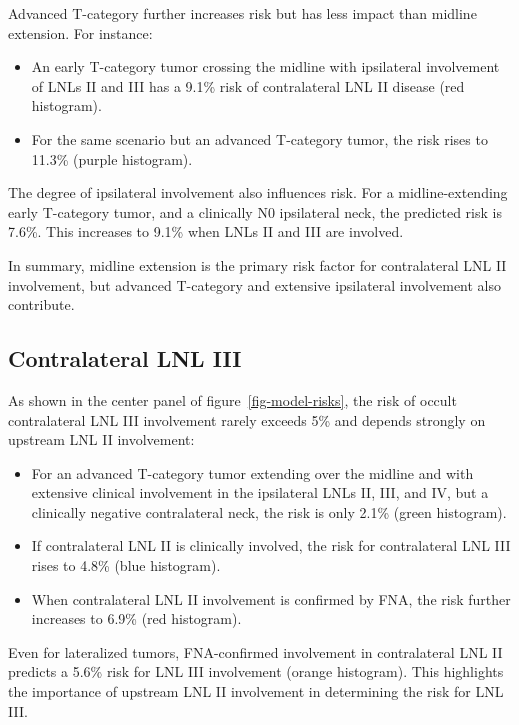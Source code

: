 \documentclass[
  sn-mathphys-num,
]{sn-jnl}
\providecommand{\tightlist}{%
  \setlength{\itemsep}{0pt}\setlength{\parskip}{0pt}}\usepackage{longtable,booktabs,array}
\begin{document}
Advanced T-category further increases risk but has less impact than
midline extension. For instance:

\begin{itemize}
\tightlist
\item
  An early T-category tumor crossing the midline with ipsilateral
  involvement of LNLs II and III has a 9.1\% risk of contralateral LNL
  II disease (red histogram).\\
\item
  For the same scenario but an advanced T-category tumor, the risk rises
  to 11.3\% (purple histogram).
\end{itemize}

The degree of ipsilateral involvement also influences risk. For a
midline-extending early T-category tumor, and a clinically N0
ipsilateral neck, the predicted risk is 7.6\%. This increases to 9.1\%
when LNLs II and III are involved.

In summary, midline extension is the primary risk factor for
contralateral LNL II involvement, but advanced T-category and extensive
ipsilateral involvement also contribute.

\subsection{Contralateral LNL III}\label{contralateral-lnl-iii}

As shown in the center panel of figure~\ref{fig-model-risks}, the risk
of occult contralateral LNL III involvement rarely exceeds 5\% and
depends strongly on upstream LNL II involvement:

\begin{itemize}
\tightlist
\item
  For an advanced T-category tumor extending over the midline and with
  extensive clinical involvement in the ipsilateral LNLs II, III, and
  IV, but a clinically negative contralateral neck, the risk is only
  2.1\% (green histogram).\\
\item
  If contralateral LNL II is clinically involved, the risk for
  contralateral LNL III rises to 4.8\% (blue histogram).\\
\item
  When contralateral LNL II involvement is confirmed by FNA, the risk
  further increases to 6.9\% (red histogram).
\end{itemize}

Even for lateralized tumors, FNA-confirmed involvement in contralateral
LNL II predicts a 5.6\% risk for LNL III involvement (orange histogram).
This highlights the importance of upstream LNL II involvement in
determining the risk for LNL III.
\end{document}
